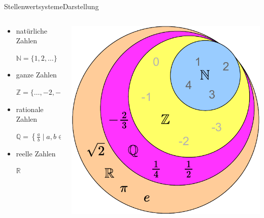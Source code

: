 \documentclass[xelatex,aspectratio=169]{beamer}
\begin{document}
\begin{frame}{Stellenwertsysteme}{Darstellung}
  \begin{columns}
    \begin{column}{0.5\textwidth}
      \begin{itemize}
        \item natürliche Zahlen

              \( \mathbb{N} = \{1, 2, \ldots\} \)
        \item ganze Zahlen

              \( \mathbb{Z} = \{\ldots, -2, -1, 0, 1, 2, \ldots\} \)
        \item rationale Zahlen

              \( \mathbb{Q} = \left\{\frac{a}{b} \mid a, b \in \mathbb{Z}, b \neq 0\right\} \)
        \item reelle Zahlen

              \( \mathbb{R} \)
      \end{itemize}
    \end{column}
    \begin{column}{0.5\textwidth}
      \includegraphics[width=.8\textwidth]{img/zahlensysteme_mengen.pdf}
    \end{column}
  \end{columns}

\end{frame}
\end{document}
